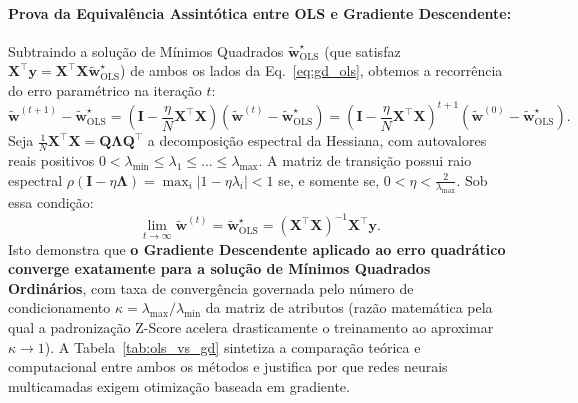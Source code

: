 \documentclass[runningheads]{llncs}
\begin{document}
\paragraph{Prova da Equival\^{e}ncia Assint\'{o}tica entre OLS e Gradiente Descendente:}
Subtraindo a solu\c{c}\~{a}o de M\'{i}nimos Quadrados $\tilde{\mathbf{w}}^\star_{\text{OLS}}$ (que satisfaz $\mathbf{X}^\top \mathbf{y} = \mathbf{X}^\top \mathbf{X}\tilde{\mathbf{w}}^\star_{\text{OLS}}$) de ambos os lados da Eq.~\eqref{eq:gd_ols}, obtemos a recorr\^{e}ncia do erro param\'{e}trico na itera\c{c}\~{a}o $t$:
\begin{equation}
    \tilde{\mathbf{w}}^{(t+1)} - \tilde{\mathbf{w}}^\star_{\text{OLS}} = \left(\mathbf{I} - \frac{\eta}{N}\mathbf{X}^\top \mathbf{X}\right)\!\left(\tilde{\mathbf{w}}^{(t)} - \tilde{\mathbf{w}}^\star_{\text{OLS}}\right) = \left(\mathbf{I} - \frac{\eta}{N}\mathbf{X}^\top \mathbf{X}\right)^{t+1}\!\left(\tilde{\mathbf{w}}^{(0)} - \tilde{\mathbf{w}}^\star_{\text{OLS}}\right).
    \label{eq:ols_gd_bridge}
\end{equation}
Seja $\frac{1}{N}\mathbf{X}^\top \mathbf{X} = \mathbf{Q}\boldsymbol{\Lambda}\mathbf{Q}^\top$ a decomposi\c{c}\~{a}o espectral da Hessiana, com autovalores reais positivos $0 < \lambda_{\min} \le \lambda_1 \le \dots \le \lambda_{\max}$. A matriz de transi\c{c}\~{a}o possui raio espectral $\rho(\mathbf{I} - \eta \boldsymbol{\Lambda}) = \max_i |1 - \eta \lambda_i| < 1$ se, e somente se, $0 < \eta < \frac{2}{\lambda_{\max}}$. Sob essa condi\c{c}\~{a}o:
\begin{equation}
    \lim_{t \to \infty} \tilde{\mathbf{w}}^{(t)} = \tilde{\mathbf{w}}^\star_{\text{OLS}} = (\mathbf{X}^\top \mathbf{X})^{-1}\mathbf{X}^\top \mathbf{y}.
\end{equation}
Isto demonstra que \textbf{o Gradiente Descendente aplicado ao erro quadr\'{a}tico converge exatamente para a solu\c{c}\~{a}o de M\'{i}nimos Quadrados Ordin\'{a}rios}, com taxa de converg\^{e}ncia governada pelo n\'{u}mero de condicionamento $\kappa = \lambda_{\max}/\lambda_{\min}$ da matriz de atributos (raz\~{a}o matem\'{a}tica pela qual a padroniza\c{c}\~{a}o Z-Score acelera drasticamente o treinamento ao aproximar $\kappa \to 1$). A Tabela~\ref{tab:ols_vs_gd} sintetiza a compara\c{c}\~{a}o te\'{o}rica e computacional entre ambos os m\'{e}todos e justifica por que redes neurais multicamadas exigem otimiza\c{c}\~{a}o baseada em gradiente.
\end{document}
